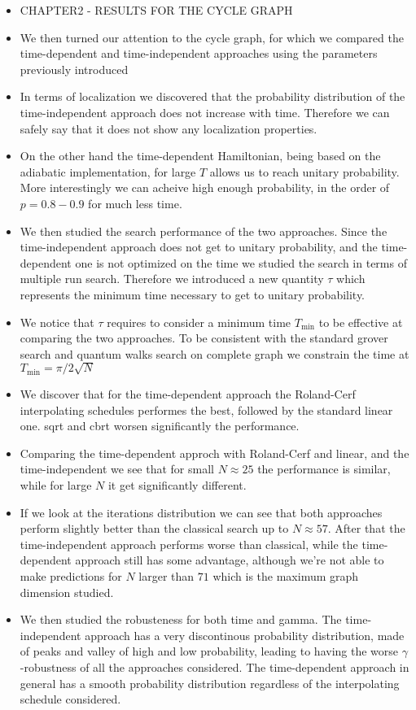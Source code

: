 \begin{itemize}
  \item CHAPTER2 - RESULTS FOR THE CYCLE GRAPH
  \item We then turned our attention to the cycle graph, for which we compared the time-dependent and time-independent approaches using the parameters previously introduced
  \item In terms of localization we discovered that the probability distribution of the time-independent approach does not increase with time. Therefore we can safely say that it does not show any localization properties.
  \item On the other hand the time-dependent Hamiltonian, being based on the adiabatic implementation, for large $T$ allows us to reach unitary probability. More interestingly we can acheive high enough probability, in the order of $p=0.8-0.9$ for much less time.
  \item We then studied the search performance of the two approaches. Since the time-independent approach does not get to unitary probability, and the time-dependent one is not optimized on the time we studied the search in terms of multiple run search. Therefore we introduced a new quantity $\tau$ which represents the minimum time necessary to get to unitary probability.
  \item We notice that $\tau$ requires to consider a minimum time $T_{\min}$ to be effective at comparing the two approaches. To be consistent with the standard grover search and quantum walks search on complete graph we constrain the time at $T_{\min}=\pi/2\sqrt{N}$
  \item We discover that for the time-dependent approach the Roland-Cerf interpolating schedules performes the best, followed by the standard linear one. sqrt and cbrt worsen significantly the performance.
  \item Comparing the time-dependent approch with Roland-Cerf and linear, and the time-independent we see that for small $N\approx 25$ the performance is similar, while for large $N$ it get significantly different.
  \item If we look at the iterations distribution we can see that both approaches perform slightly better than the classical search up to $N\approx 57$. After that the time-independent approach performs worse than classical, while the time-dependent approach still has some advantage, although we're not able to make predictions for $N$ larger than $71$ which is the maximum graph dimension studied.
  \item We then studied the robusteness for both time and gamma. The time-independent approach has a very discontinous probability distribution, made of peaks and valley of high and low probability, leading to having the worse $\gamma$-robustness of all the approaches considered. The time-dependent approach in general has a smooth probability distribution regardless of the interpolating schedule considered.

\end{itemize}
